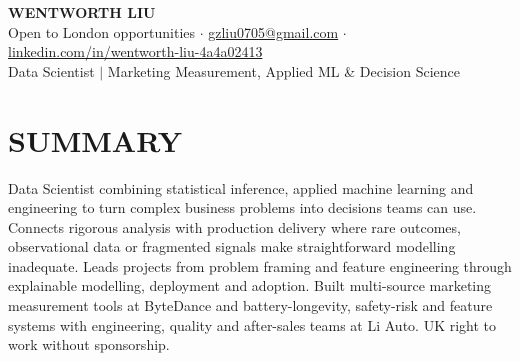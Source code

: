 \documentclass[a4paper,10pt]{article}
\begin{document}
\fontsize{9.4pt}{10.6pt}\selectfont

\begin{center}
{\Large\bfseries WENTWORTH LIU}\\[2pt]
{\small Open to London opportunities \;$\cdot$\; \href{mailto:gzliu0705@gmail.com}{gzliu0705@gmail.com} \;$\cdot$\; \href{https://www.linkedin.com/in/wentworth-liu-4a4a02413}{linkedin.com/in/wentworth-liu-4a4a02413}}\\[2pt]
{\small Data Scientist \;$\vert$\; Marketing Measurement, Applied ML \& Decision Science}
\end{center}
\vspace{-4pt}

\section{SUMMARY}
Data Scientist combining statistical inference, applied machine learning and engineering to turn complex business problems into decisions teams can use. Connects rigorous analysis with production delivery where rare outcomes, observational data or fragmented signals make straightforward modelling inadequate. Leads projects from problem framing and feature engineering through explainable modelling, deployment and adoption. Built multi-source marketing measurement tools at ByteDance and battery-longevity, safety-risk and feature systems with engineering, quality and after-sales teams at Li Auto. UK right to work without sponsorship.
\end{document}
